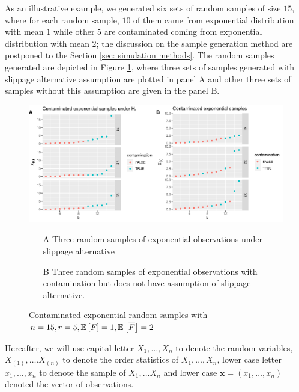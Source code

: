 \documentclass{report}
\begin{document}
As an illustrative example, we generated six sets of random samples of size $15$,
where for each random sample, $10$ of them came from exponential distribution with mean $1$ while other $5$ are contaminated coming 
 from exponential distribution with mean $2$; the discussion on the sample generation method are postponed to the Section \ref{sec: simulation methods}.
The random samples generated are depicted in Figure \ref{Figure: slippage sample},
where three sets of samples generated with slippage alternative assumption are plotted
in panel A and other three sets of samples without this assumption are given in the panel B.



\begin{figure}[hbtp]
    \centering
    \includegraphics[scale = 0.6]{plot_0.pdf}
    \caption{Contaminated exponential random samples with $n =15, r =5, \mathbb{E}_{} \left[ F \right] =1, \mathbb{E}_{} \left[ \overline{F} \right] = 2$}
    {\label{Figure: slippage sample}
        \par {\small \begin{itemize}
            \item[A] Three random samples of exponential observations under slippage alternative\\
            \item[B] Three random samples of exponential observations with contamination but does not have assumption of slippage alternative.
        \end{itemize}
    }}
\end{figure}

Hereafter, we will use capital letter $X_1,\ldots,X_n$ to denote the random variables, $X_{(1)},\ldots. X_{(n)}$ to denote the order statistics of $X_1,\ldots,X_n$,
lower case letter $x_1,\ldots,x_n$ to denote the sample of $X_1,\ldots X_n$ and lower case $\mathbf x = (x_1,\ldots, x_n)$ denoted the vector of observations. 
\end{document}

